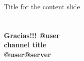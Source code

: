 \documentclass[aspectratio=169]{beamer}
\begin{document}
    \frame{\titlepage}
    
    \begin{frame}{Title for the content slide}
        \tableofcontents
    \end{frame}

    



    \section{}
    \begin{frame}{}
        \centering
            \Huge\bfseries
            \textcolor{yellowCAD}{Gracias!!!}
            \vspace{1cm}
            \huge
            \textcolor{twitter}{\faTwitter } @user \\
            \textcolor{youtube}{\faYoutube } channel title \\
            \textcolor{mastodon}{\faMastodon } @user@server \\
    \end{frame}
\end{document}
